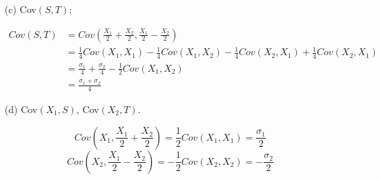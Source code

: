 \documentclass{article}
\newcommand{\1}{\mathbf{1}}
\begin{document}
\begin{enumerate}
    \item[(c)] Cov$(S,T)$;

    \begin{align*}
        Cov(S, T) &= Cov\left(\frac{X_1}{2}+\frac{X_2}{2}, \frac{X_1}{2}-\frac{X_2}{2} \right) \\
        &= \frac{1}{4} Cov(X_1, X_1) - \frac{1}{4} Cov(X_1, X_2) - \frac{1}{4}Cov(X_2, X_1) + \frac{1}{4} Cov(X_2, X_1)\\
        &= \frac{\sigma_1}{4} + \frac{\sigma_2}{4} - \frac{1}{2}Cov(X_1, X_2) \\
        &= \frac{\sigma_1 + \sigma_2}{4}
    \end{align*}

    \item[(d)] Cov$(X_1,S)$, Cov$(X_2,T)$.
    
    $$Cov\left(X_1, \frac{X_1}{2}+\frac{X_2}{2}\right) = \frac{1}{2} Cov(X_1, X_1) =  \frac{\sigma_1}{2} $$
    $$Cov\left(X_2, \frac{X_1}{2}-\frac{X_2}{2}\right) = -\frac{1}{2} Cov(X_2, X_2) =  -\frac{\sigma_2}{2} $$
\end{enumerate}



\newpage
\end{document}
